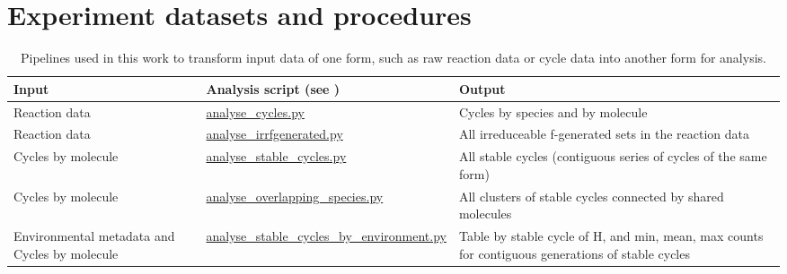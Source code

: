 \chapter{Experiment datasets and procedures}\label{datasets}

\begin{table}
	\scriptsize
	\begin{center}
		\caption{Pipelines used in this work to transform input data of one form, such as raw reaction data or cycle data into another form for analysis.}\label{tbl:datasets}
		\begin{tabular}{p{4cm}p{4cm}p{5cm}}
			\toprule
			Input & Analysis script (see \cite{toyworld2}) & Output\\
			\midrule
			Reaction data 									& \url{analyse_cycles.py}						& Cycles by species and by molecule \\
			Reaction data									& \url{analyse_irrfgenerated.py}				& All irreduceable f-generated sets in the reaction data\\
			\midrule
			Cycles by molecule								& \url{analyse_stable_cycles.py}				& All stable cycles (contiguous series of cycles of the same form)\\
			Cycles by molecule								& \url{analyse_overlapping_species.py}			& All clusters of stable cycles connected by shared molecules\\
			Environmental metadata and Cycles by molecule	& \url{analyse_stable_cycles_by_environment.py}	& Table by stable cycle of H, and min, mean, max counts for contiguous generations of stable cycles\\
			\bottomrule
		\end{tabular}
	\end{center}
\end{table}


